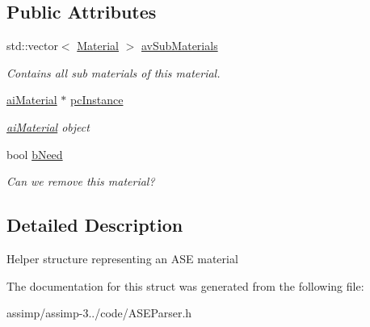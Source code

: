 \subsection*{Public Attributes}
\begin{DoxyCompactItemize}
\item 
\hypertarget{struct_assimp_1_1_a_s_e_1_1_material_a0f3608639329e5535559926b6f05c796}{std\+::vector$<$ \hyperlink{struct_assimp_1_1_d3_d_s_1_1_material}{Material} $>$ \hyperlink{struct_assimp_1_1_a_s_e_1_1_material_a0f3608639329e5535559926b6f05c796}{av\+Sub\+Materials}}\label{struct_assimp_1_1_a_s_e_1_1_material_a0f3608639329e5535559926b6f05c796}

\begin{DoxyCompactList}\small\item\em Contains all sub materials of this material. \end{DoxyCompactList}\item 
\hypertarget{struct_assimp_1_1_a_s_e_1_1_material_adb1a52f5e802704b6975a42d0cdf5571}{\hyperlink{classai_material}{ai\+Material} $\ast$ \hyperlink{struct_assimp_1_1_a_s_e_1_1_material_adb1a52f5e802704b6975a42d0cdf5571}{pc\+Instance}}\label{struct_assimp_1_1_a_s_e_1_1_material_adb1a52f5e802704b6975a42d0cdf5571}

\begin{DoxyCompactList}\small\item\em \hyperlink{classai_material}{ai\+Material} object \end{DoxyCompactList}\item 
\hypertarget{struct_assimp_1_1_a_s_e_1_1_material_a954ede7cbd8d15001441556a7db0734e}{bool \hyperlink{struct_assimp_1_1_a_s_e_1_1_material_a954ede7cbd8d15001441556a7db0734e}{b\+Need}}\label{struct_assimp_1_1_a_s_e_1_1_material_a954ede7cbd8d15001441556a7db0734e}

\begin{DoxyCompactList}\small\item\em Can we remove this material? \end{DoxyCompactList}\end{DoxyCompactItemize}


\subsection{Detailed Description}
Helper structure representing an A\+S\+E material 

The documentation for this struct was generated from the following file\+:\begin{DoxyCompactItemize}
\item 
assimp/assimp-\/3../code/A\+S\+E\+Parser.\+h\end{DoxyCompactItemize}

